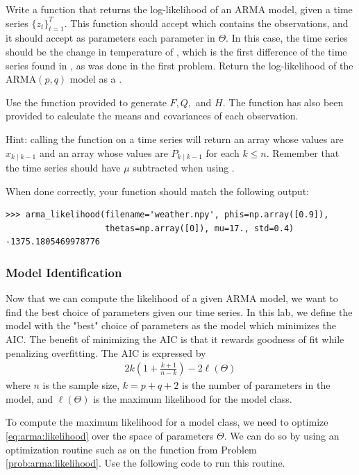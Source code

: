\begin{problem}
\label{prob:arma:likelihood}
Write a function  that returns the log-likelihood of an ARMA model, given a time series $\{z_t\}_{t=1}^T$.
This function should accept  which contains the observations, and it should accept as parameters each parameter in $\Theta$. 
In this case, the time series should be the change in temperature of , which is the first difference of the time series found in , as was done in the first problem.
Return the log-likelihood of the $\text{ARMA}(p,q)$ model as a .

Use the  function provided to generate $F,Q,$ and $H$.
The function  has also been provided to calculate the means and covariances of each observation.

\noindent Hint: calling the function  on a time series will return an array whose values are $x_{k\mid k-1}$ and an array whose values are $P_{k\mid k-1}$ for each $k\leq n$.
Remember that the time series should have $\mu$ subtracted when using .

When done correctly, your function should match the following output:
\begin{lstlisting}
>>> arma_likelihood(filename='weather.npy', phis=np.array([0.9]), 
                    thetas=np.array([0]), mu=17., std=0.4)
-1375.1805469978776
\end{lstlisting}
\end{problem}

\subsubsection*{Model Identification}

Now that we can compute the likelihood of a given ARMA model, we want to find the best choice of parameters given our time series.
In this lab, we define the model with the "best" choice of parameters as the model which minimizes the AIC.
The benefit of minimizing the AIC is that it rewards goodness of fit while penalizing overfitting.
The AIC is expressed by
\begin{align}
    2k\left(1 + \frac{k+1}{n-k}\right) - 2 \ell(\Theta)
\end{align}
where $n$ is the sample size, $k = p + q + 2$ is the number of parameters in
the model, and $\ell(\Theta)$ is the maximum likelihood for the model class.

To compute the maximum likelihood for a model class, we need to optimize
\ref{eq:arma:likelihood} over the space of parameters $\Theta$. We can do so
by using an optimization routine such as  on the function  from Problem \ref{prob:arma:likelihood}.
Use the following code to run this routine.

